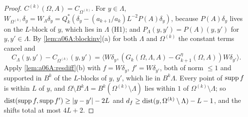 \begin{proof}
$C^{(k)}(\Omega,A)=C_{\Omega^{(k)}}$. For $y\in\Lambda$, $W_{\Omega^{(k)}}\delta_y=W_\Lambda\delta_y=Q_k^*(\delta_y-(a_{k+1}/a_k)L^{-2}P(A)\delta_y)$, because $P(A)\delta_y$ lives on the $L$-block of $y$, which lies in $\Lambda$ (H1); and $P_\Lambda(y,y')=P(A)(y,y')$ for $y,y'\in\Lambda$. By \cref{lem:a06A:blockinv}(a) for both $\Lambda$ and $\Omega^{(k)}$ the constant terms cancel and
\[
C_\Lambda(y,y')-C_{\Omega^{(k)}}(y,y')=\langle W\delta_y,(G_k(\Omega,\Lambda,A)-G^\eta_{k+1}(\Omega,A))W\delta_{y'}\rangle .
\]
Apply \cref{lem:a06A:resdiff}(b) with $f=W\delta_y$, $f'=W\delta_{y'}$, both of norm $\le1$ and supported in $B^k$ of the $L$-blocks of $y$, $y'$, which lie in $B^k\Lambda$. Every point of $\operatorname{supp} f$ is within $L$ of $y$, and $\Omega\setminus B^k\Lambda=B^k(\Omega^{(k)}\setminus\Lambda)$ lies within $1$ of $\Omega^{(k)}\setminus\Lambda$; so $\operatorname{dist}(\operatorname{supp} f,\operatorname{supp} f')\ge|y-y'|-2L$ and $d_f\ge\operatorname{dist}(y,\Omega^{(k)}\setminus\Lambda)-L-1$, and the shifts total at most $4L+2$.
\end{proof}


